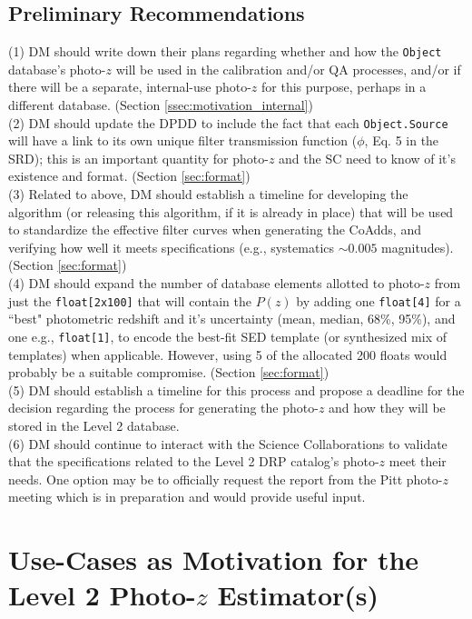 \documentclass[DM,lsstdraft,toc]{lsstdoc}
\begin{document}
\subsection{Preliminary Recommendations}\label{ssec:intro_pr}

\noindent (1) DM should write down their plans regarding whether and how the \texttt{Object} database's photo-$z$ will be used in the calibration and/or QA processes, and/or if there will be a separate, internal-use photo-$z$ for this purpose, perhaps in a different database. (Section \ref{ssec:motivation_internal}) \\
(2) DM should update the DPDD to include the fact that each \texttt{Object.Source} will have a link to its own unique filter transmission function ($\phi$, Eq. 5 in the SRD); this is an important quantity for photo-$z$ and the SC need to know of it's existence and format. (Section \ref{sec:format}) \\
(3) Related to above, DM should establish a timeline for developing the algorithm (or releasing this algorithm, if it is already in place) that will be used to standardize the effective filter curves when generating the CoAdds, and verifying how well it meets specifications (e.g., systematics $\sim 0.005$ magnitudes). (Section \ref{sec:format})\\
(4) DM should expand the number of database elements allotted to photo-$z$ from just the \texttt{float[2x100]} that will contain the $P(z)$ by adding one \texttt{float[4]} for a ``best" photometric redshift and it's uncertainty (mean, median, 68\%, 95\%), and one e.g., \texttt{float[1]}, to encode the best-fit SED template (or synthesized mix of templates) when applicable. However, using 5 of the allocated 200 floats would probably be a suitable compromise. (Section \ref{sec:format}) \\
(5) DM should establish a timeline for this process and propose a deadline for the decision regarding the process for generating the photo-$z$ and how they will be stored in the Level 2 database. \\
(6) DM should continue to interact with the Science Collaborations to validate that the specifications related to the Level 2 DRP catalog's photo-$z$ meet their needs. One option may be to officially request the report from the Pitt photo-$z$ meeting which is in preparation and would provide useful input.


\section{Use-Cases as Motivation for the Level 2 Photo-$z$ Estimator(s)}\label{sec:motivation}
\end{document}

